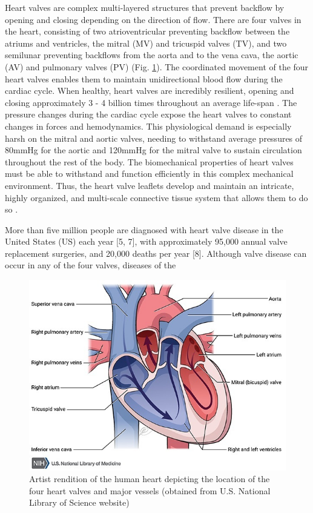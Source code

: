     Heart valves are complex multi-layered structures that prevent backflow by opening and closing depending on the direction of flow. There are four valves in the heart, consisting of two atrioventricular preventing backflow between the atriums and ventricles, the mitral (MV) and tricuspid valves (TV), and two semilunar preventing backflows from the aorta and to the vena cava, the aortic (AV) and pulmonary valves (PV) (Fig. \ref{fig:heartdiagram}). The coordinated movement of the four heart valves enables them to maintain unidirectional blood flow during the cardiac cycle. When healthy, heart valves are incredibly resilient, opening and closing approximately 3 - 4 billion times throughout an average life-span \cite{sacks_biomechanics_2009}. The pressure changes during the cardiac cycle expose the heart valves to constant changes in forces and hemodynamics. This physiological demand is especially harsh on the mitral and aortic valves, needing to withstand average pressures of 80mmHg for the aortic and 120mmHg for the mitral valve to sustain circulation throughout the rest of the body. The biomechanical properties of heart valves must be able to withstand and function efficiently in this complex mechanical environment. Thus, the heart valve leaflets develop and maintain an intricate, highly organized, and multi-scale connective tissue system that allows them to do so \cite{tao_heart_2012}. 

    
    More than five million people are diagnosed with heart valve disease in the United States (US) each year [5, 7], with approximately 95,000 annual valve replacement surgeries, and 20,000 deaths per year [8]. Although valve disease can occur in any of the four valves, diseases of the 
    

\begin{figure}
\centering
\includegraphics[width=5.0in]{Images/chapter1/heartdiagram.jpeg}
\caption{Artist rendition of the human heart depicting the location of the four heart valves and major vessels (obtained from U.S. National Library of Science website)}
\label{fig:heartdiagram}
\end{figure}

